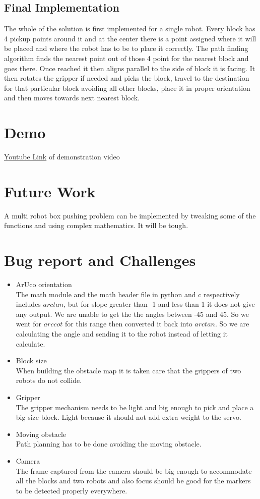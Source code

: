 \documentclass[a4paper,12pt,oneside]{book}
\begin{document}
\subsection*{Final Implementation}
The whole of the solution is first implemented for a single robot. Every block has 4 pickup points around it and at the center there is a point assigned where it will be placed and where the robot has to be to place it correctly. The path finding algorithm finds the nearest point out of those 4 point for the nearest block and goes there. Once reached it then aligns parallel to the side of block it is facing. It then rotates the gripper if needed and picks the block, travel to the destination for that particular block avoiding all other blocks, place it in proper orientation and then moves towards next nearest block.
\section{Demo}
\href{https://youtu.be/8kYgtcB6HzI}{Youtube Link} of demonstration video 

\section{Future Work}
A multi robot box pushing problem can be implemented by tweaking some of the functions and using complex mathematics. It will be tough.
\section{Bug report and Challenges}
\begin{itemize}
\color{red}
\item ArUco orientation\\\color{black}
The math module and the math header file in python and c respectively includes $arctan$, but for slope greater than -1 and less than 1 it does not give any output. We are unable to get the the angles between -45 and 45. So we went for $arccot$ for this range then converted it back into $arctan$. So we are calculating the angle and sending it to the robot instead of letting it calculate.
\color{red}
\item Block size\\\color{black}
When building the obstacle map it is taken care that the grippers of two robots do not collide.
\color{red}
\item Gripper\\\color{black}
The gripper mechanism needs to be light and big enough to pick and place a big size block. Light because it should not add extra weight to the servo.
\color{red}
\item Moving obstacle\\\color{black}
Path planning has to be done avoiding the moving obstacle.
\color{red}
\item Camera\\\color{black}
The frame captured from the camera should be big enough to accommodate all the blocks and two robots and also focus should be good for the markers to be detected properly everywhere. 
\end{itemize}
\end{document}
